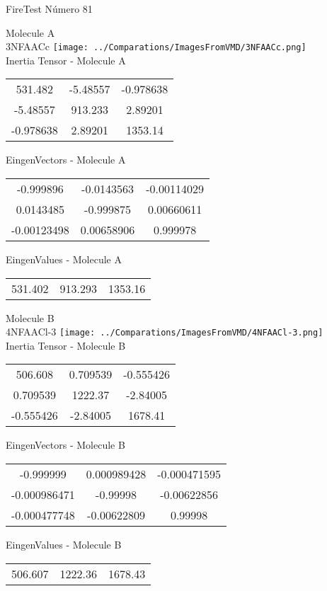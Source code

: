 \vtab[-2cm]
\begin{center}
{\large FireTest \tab Número 81}
\end{center}
\begin{multicols}{2}
\begin{center}

Molecule A \\ 
3NFAACc
\texttt{[image: ../Comparations/ImagesFromVMD/3NFAACc.png]}
\\
Inertia Tensor - Molecule A \\
\vtab

\begin{tabular}{|c c c|}
531.482	 & 	-5.48557	 & 	-0.978638	 \\
-5.48557	 & 	913.233	 & 	2.89201	 \\
-0.978638	 & 	2.89201	 & 	1353.14
\end{tabular}

\vtab
 EingenVectors - Molecule A     \\
\vtab
\begin{tabular}{|c c c|}
-0.999896	 & 	-0.0143563	 & 	-0.00114029	 \\
0.0143485	 & 	-0.999875	 & 	0.00660611	 \\
-0.00123498	 & 	0.00658906	 & 	0.999978
\end{tabular}

\vtab
 EingenValues - Molecule A     \\
\vtab
\begin{tabular}{|c c c|}
531.402	 & 	913.293	 & 	1353.16	 \\
\end{tabular}
\columnbreak

Molecule B \\ 
4NFAACl-3
\texttt{[image: ../Comparations/ImagesFromVMD/4NFAACl-3.png]}
\\
Inertia Tensor - Molecule B \\
\vtab

\begin{tabular}{|c c c|}
506.608	 & 	0.709539	 & 	-0.555426	 \\
0.709539	 & 	1222.37	 & 	-2.84005	 \\
-0.555426	 & 	-2.84005	 & 	1678.41
\end{tabular}

\vtab
 EingenVectors - Molecule B     \\
\vtab
\begin{tabular}{|c c c|}
-0.999999	 & 	0.000989428	 & 	-0.000471595	 \\
-0.000986471	 & 	-0.99998	 & 	-0.00622856	 \\
-0.000477748	 & 	-0.00622809	 & 	0.99998
\end{tabular}

\vtab
 EingenValues - Molecule B     \\
\vtab
\begin{tabular}{|c c c|}
506.607	 & 	1222.36	 & 	1678.43	 \\
\end{tabular}

\end{center}
\end{multicols}
